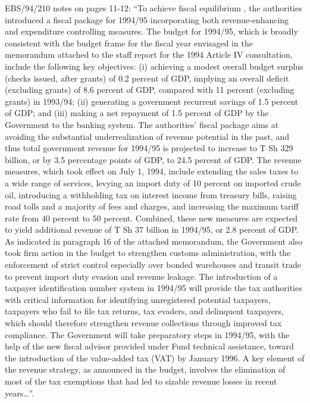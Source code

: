 EBS/94/210 notes on pages 11-12: “To achieve fiscal equilibrium , the authorities introduced a fiscal package for 1994/95 incorporating both revenue-enhancing and expenditure controlling measures. The budget for 1994/95, which is broadly consistent with the budget frame for the fiscal year envisaged in the memorandum attached to the staff report for the 1994 Article IV consultation, include the following key objectives: (i) achieving a modest overall budget surplus (checks issued, after grants) of 0.2 percent of GDP, implying an overall deficit (excluding grants) of 8.6 percent of GDP, compared with 11 percent (excluding grants) in 1993/94; (ii) generating a government recurrent savings of 1.5 percent of GDP; and (iii) making a net repayment of 1.5 percent of GDP by the Government to the banking system. 
The authorities' fiscal package aims at avoiding the substantial underrealization of revenue potential in the past, and thus total government revenue for 1994/95 is projected to increase to T Sh 329 billion, or by 3.5 percentage points of GDP, to 24.5 percent of GDP. The revenue measures, which took effect on July 1, 1994, include extending the sales taxes to a wide range of services, levying an import duty of 10 percent on imported crude oil, introducing a withholding tax on interest income from treasury bills, raising road tolls and a majority of fees and charges, and increasing the maximum tariff rate from 40 percent to 50 percent. Combined, these new measures are expected to yield additional revenue of T Sh 37 billion in 1994/95, or 2.8 percent of GDP. As indicated in paragraph 16 of the attached memorandum, the Government also took firm action in the budget to strengthen customs administration, with the enforcement of strict control especially over bonded warehouses and transit trade to prevent import duty evasion and revenue leakage. The introduction of a taxpayer identification number system in 1994/95 will provide the tax authorities with critical information for identifying unregistered potential taxpayers, taxpayers who fail to file tax returns, tax evaders, and delinquent taxpayers, which should therefore strengthen revenue collections through improved tax compliance. The Government will take preparatory steps in 1994/95, with the help of the new fiscal advisor provided under Fund technical assistance, toward the introduction of the value-added tax (VAT) by January 1996. 
A key element of the revenue strategy, as announced in the budget, involves the elimination of most of the tax exemptions that had led to sizable revenue losses in recent years…”.

